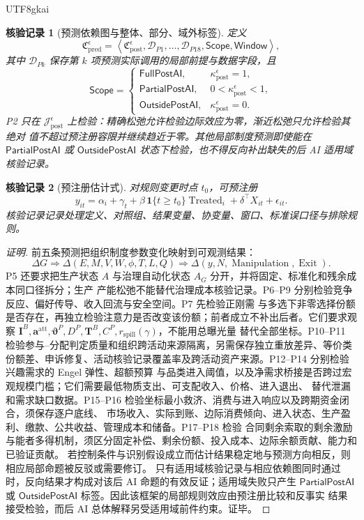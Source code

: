 \documentclass[12pt,a4paper,openany]{report}
\newtheorem{Certificate}{核验记录}[chapter]
\newcommand{\Goods}{\mathcal J}
\newcommand{\Tuple}[1]{\left\langle #1\right\rangle}
\begin{document}
\begin{CJK*}{UTF8}{gkai}
\begin{Certificate}[预测依赖图与整体、部分、域外标签]
定义
\[
  \mathfrak C_{\mathrm{pred}}^\epsilon
  =
  \Tuple{
  \mathfrak C_{\mathrm{post}}^\epsilon,
  \mathcal D_{P1},\ldots,\mathcal D_{P18},
  \mathsf{Scope},
  \mathsf{Window}
  },
\]
其中 \(\mathcal D_{Pk}\) 保存第 \(k\) 项预测实际调用的局部前提与数据字段，且
\[
  \mathsf{Scope}
  =
  \begin{cases}
    \mathsf{FullPostAI},&\kappa_{\mathrm{post}}^\epsilon=1,\\
    \mathsf{PartialPostAI},&0<\kappa_{\mathrm{post}}^\epsilon<1,\\
    \mathsf{OutsidePostAI},&\kappa_{\mathrm{post}}^\epsilon=0.
  \end{cases}
\]
P2 只在 \(\Goods_{\mathrm{post}}^\epsilon\) 上检验：精确松弛允许检验边际效应为零，渐近松弛只允许检验其绝对
值不超过预注册容限并继续趋近于零。其他局部制度预测即使能在
\(\mathsf{PartialPostAI}\) 或 \(\mathsf{OutsidePostAI}\) 状态下检验，也不得反向补出缺失的后 AI 适用域核验记录。
\end{Certificate}

\begin{Certificate}[预注册估计式]
对规则变更时点 \(t_0\)，可预注册
\[
  y_{it}
  =
  \alpha_i+\gamma_t
  +\beta\,
  \mathbf 1\{t\ge t_0\}\operatorname{Treated}_i
  +\delta^\top X_{it}+\epsilon_{it}.
\]
核验记录记录处理定义、对照组、结果变量、协变量、窗口、标准误口径与排除规则。
\end{Certificate}

\begin{proof}[证明]
前五条预测把组织制度参数变化映射到可观测结果：
\[
  \Delta G
  \Longrightarrow
  \Delta(E,M,V,W,\phi,T,L,Q)
  \Longrightarrow
  \Delta(y,N,\operatorname{Manipulation},\operatorname{Exit}).
\]
P5 还要求把生产状态 \(A\) 与治理自动化状态 \(A_G\) 分开，并将固定、标准化和残余成本同口径拆分；生产
产能松弛不能替代治理成本核验记录。P6--P9 分别检验竞争反应、偏好传导、收入回流与安全空间。P7 先检验正刚需
与多选下非零选择份额是否存在，再独立检验注意力是否改变该份额；前者成立不补出后者。它们要求观察
\(\mathbf I^B,\mathbf a^{\mathrm{att}},\boldsymbol\vartheta^P,D^P,\mathbf T^B,C^P,
r_{\mathrm{spill}}(\gamma)\)，不能用总曝光量
替代全部坐标。P10--P11 检验参与--分配判定质量和组织跨活动来源隔离，另需保存独立重放差异、等价类
份额差、申诉修复、活动核验记录覆盖率及跨活动资产来源。P12--P14 分别检验兴趣需求的 Engel 弹性、超额预算
与品类进入阈值，以及净需求桥接是否跨过宏观规模门槛；它们需要最低物质支出、可支配收入、价格、进入退出、
替代泄漏和需求缺口数据。P15--P16 检验坐标最小救济、消费与进入响应以及跨期资金闭合，须保存逐户底线、
市场收入、实际到账、边际消费倾向、进入状态、生产盈利、缴款、公共收益、管理成本和储备。P17--P18 检验
合同剩余索取的剩余激励与能者多得机制，须区分固定补偿、剩余份额、投入成本、边际余额贡献、能力和已验证贡献。
若控制条件与识别假设成立而估计结果稳定地与预测方向相反，则相应局部命题被反驳或需要修订。
只有适用域核验记录与相应依赖图同时通过时，反向结果才构成对该后 AI 命题的有效反证；适用域失败只产生
\(\mathsf{PartialPostAI}\) 或 \(\mathsf{OutsidePostAI}\) 标签。因此该框架的局部规则效应由预注册比较和反事实
结果接受检验，而后 AI 总体解释另受适用域前件约束。证毕。
\end{proof}


\end{CJK*}
\end{document}
